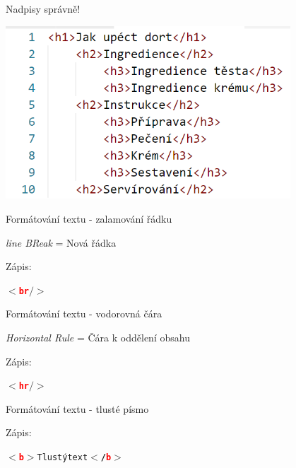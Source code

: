 \documentclass[aspectratio=1610]{beamer}
\begin{document}
\begin{frame}{Nadpisy správně!}
    \begin{center}
        \includegraphics[width=0.8\textwidth]{img/html-cake.png}
    \end{center}
\end{frame}

\begin{frame}{Formátování textu - zalamování řádku}
    \begin{cardTiny}
        \begin{flushleft}
            \textit{line BReak} = Nová řádka

            Zápis: \begin{alltt}\textbf{$<$\textcolor{red}{br}$ />$}\end{alltt}
        \end{flushleft}
    \end{cardTiny}
\end{frame}

\begin{frame}{Formátování textu - vodorovná čára}
    \begin{cardTiny}
        \begin{flushleft}
            \textit{Horizontal Rule} = Čára k oddělení obsahu 

            Zápis: \begin{alltt}\textbf{$<$\textcolor{red}{hr}$ />$}\end{alltt}
        \end{flushleft}
    \end{cardTiny}
\end{frame}

\begin{frame}{Formátování textu - tlusté písmo}
    \begin{cardTiny}
        \begin{flushleft}
            Zápis: \begin{alltt}\textbf{$<$\textcolor{red}{b}$>$}Tlustý text\textbf{$<$/\textcolor{red}{b}$>$}\end{alltt}
        \end{flushleft}
    \end{cardTiny}
\end{frame}
\end{document}
